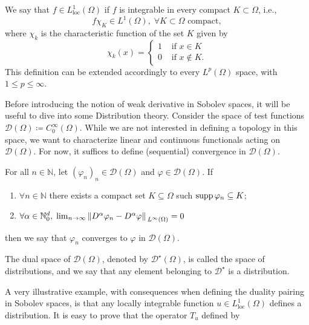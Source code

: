 \begin{definition}
    We say that \(f \in L^1_{\text{loc}}(\Omega)\) if \(f\) is integrable in every compact \(K \subset \Omega\), i.e.,
    \[
        f \chi_K \in L^1(\Omega), \; \forall K \subset \Omega \text{ compact},
    \]
    where \(\chi_k\) is the characteristic function of the set \(K\) given by 
    \[
        \chi_k(x) = \begin{cases}
            1 & \text{ if } x \in K\\
            0 & \text{ if } x \not\in K.
        \end{cases}
    \]
    This definition can be extended accordingly to every \(L^p (\Omega)\) space, with \(1 \leq p \leq \infty\).
\end{definition}
Before introducing the notion of weak derivative in Sobolev spaces, it will be useful to dive into some Distribution theory. Consider the space of test functions \(\mathcal{D}(\Omega) \coloneqq C_0^\infty(\Omega)\).
While we are not interested in defining a topology in this space, we want to characterize linear and continuous functionals acting on \(\mathcal{D}(\Omega)\). For now, it suffices to define (sequential) convergence in \(\mathcal{D}(\Omega)\).
\begin{definition}
    For all \(n \in \mathbb{N}\), let \((\varphi_n)_n \in \mathcal{D}(\Omega)\) and \(\varphi \in \mathcal{D}(\Omega)\). If 
    \begin{enumerate}
        \item   \(\forall n \in \mathbb{N}\) there exists a compact set \(K \subseteq \Omega\) such \(\operatorname{supp} \varphi_n \subseteq K\);
        \item \(\forall \alpha \in \mathbb{N}_0^d, \; \lim_{n \rightarrow \infty} \norm*{D^\alpha \varphi_n - D^\alpha \varphi}_{L^\infty(\Omega)} = 0\)
    \end{enumerate}
    then we say that \(\varphi_n\) converges to \(\varphi\) in \(\mathcal{D}(\Omega)\).
\end{definition}
\begin{definition}
    The dual space of \(\mathcal{D}(\Omega)\), denoted by \(\mathcal{D}^\star(\Omega)\), is called the space of distributions, and we say that any element belonging to \(\mathcal{D}^\star\) is a distribution.
\end{definition}
A very illustrative example, with consequences when defining the duality pairing in Sobolev spaces, is that any locally integrable function \(u \in L^1_{\text{loc}}(\Omega)\) defines a distribution. It is easy to prove that the operator \(T_u\) defined by
